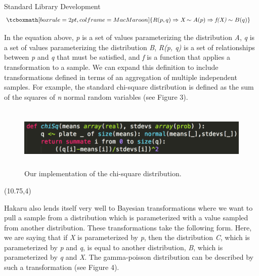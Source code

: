 \documentclass[22pt]{beamer}
\newenvironment{variableblock}[3]{%
  \setbeamercolor{block body}{#2}
  \setbeamercolor{block title}{#3}
  \begin{block}{#1}}{\end{block}}
\begin{document}
\begin{frame}[fragile]
\begin{textblock}{5}
\begin{textblock}{5}
\begin{block}{Standard Library Development}
\begin{equation*}
\begin{aligned}
& \tcboxmath[boxrule=2pt,colframe=MacMaroon]{R(p, q) \Rightarrow \textit{X} \sim A(p) \Rightarrow \textit{f(X)} \sim B(q)}
\end{aligned}
\end{equation*}

\bigskip

\tiny{In the equation above, \textit{p} is a set of values parameterizing the distribution \textit{A}}, \textit{q} is a set of values parameterizing the distribution \textit{B}, \textit{R(p, q)} is a set of relationships between \textit{p} and \textit{q} that must be satisfied, and \textit{f} is a function that applies a transformation to a sample. We can expand this definition to include transformations defined in terms of an aggregation of multiple independent samples. For example, the standard chi-square distribution is defined as the sum of the squares of \textit{n} normal random variables (see Figure 3). 

\begin{figure}
\centering
\includegraphics[height=3cm]{chi-square.png}
\caption{\tiny{Our implementation of the chi-square distribution.}}
\end{figure}

\bigskip



\end{block}

\end{textblock}

\end{textblock}


\begin{textblock}{5}(10.75,4)

\begin{variableblock}{}{}{}
\justifying

\tiny{Hakaru also lends itself very well to Bayesian transformations where we want to pull a sample from a distribution which is parameterized with a value sampled from another distribution. These transformations take the following form. Here, we are saying that if \textit{X} is parameterized by \textit{p}, then the distribution \textit{C}, which is parameterized by \textit{p} and \textit{q}, is equal to another distribution, \textit{B}, which is parameterized by \textit{q} and \textit{X}. The gamma-poisson distribution can be described by such a transformation (see Figure 4).}


\end{variableblock}
\end{textblock}
\end{frame}
\end{document}
